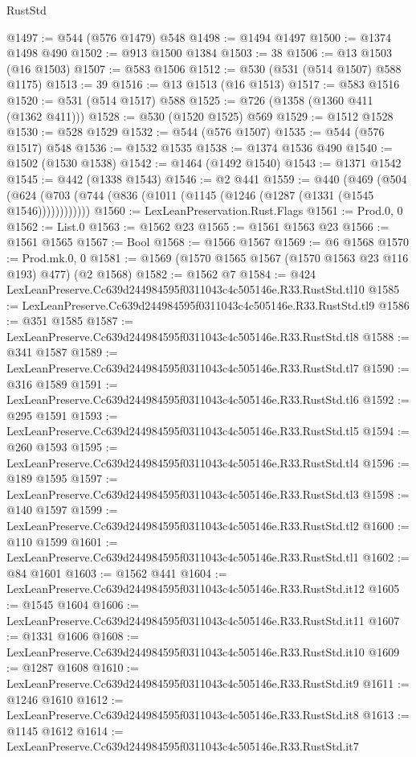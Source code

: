 \begin{lexlean}{RustStd}
\begin{coremodule}
@1497 := @544 (@576 @1479) @548
@1498 := @1494 @1497
@1500 := @1374 @1498 @490
@1502 := @913 @1500 @1384
@1503 := 38
@1506 := @13 @1503 (@16 @1503)
@1507 := @583 @1506
@1512 := @530 (@531 (@514 @1507) @588 @1175)
@1513 := 39
@1516 := @13 @1513 (@16 @1513)
@1517 := @583 @1516
@1520 := @531 (@514 @1517) @588
@1525 := @726 (@1358 (@1360 @411 (@1362 @411)))
@1528 := @530 (@1520 @1525) @569
@1529 := @1512 @1528
@1530 := @528 @1529
@1532 := @544 (@576 @1507)
@1535 := @544 (@576 @1517) @548
@1536 := @1532 @1535
@1538 := @1374 @1536 @490
@1540 := @1502 (@1530 @1538)
@1542 := @1464 (@1492 @1540)
@1543 := @1371 @1542
@1545 := @442 (@1338 @1543)
@1546 := @2 @441
@1559 := @440
    (@469 (@504 (@624 (@703 (@744 (@836 (@1011 (@1145 (@1246 (@1287 (@1331 (@1545 @1546))))))))))))
@1560 := LexLeanPreservation.Rust.Flags
@1561 := Prod.{0, 0}
@1562 := List.{0}
@1563 := @1562 @23
@1565 := @1561 @1563 @23
@1566 := @1561 @1565
@1567 := Bool
@1568 := @1566 @1567
@1569 := @6 @1568
@1570 := Prod.mk.{0, 0}
@1581 := @1569 (@1570 @1565 @1567 (@1570 @1563 @23 @116 @193) @477) (@2 @1568)
@1582 := @1562 @7
@1584 := @424 LexLeanPreserve.Cc639d244984595f0311043c4c505146e.R33.RustStd.tl10
@1585 := LexLeanPreserve.Cc639d244984595f0311043c4c505146e.R33.RustStd.tl9
@1586 := @351 @1585
@1587 := LexLeanPreserve.Cc639d244984595f0311043c4c505146e.R33.RustStd.tl8
@1588 := @341 @1587
@1589 := LexLeanPreserve.Cc639d244984595f0311043c4c505146e.R33.RustStd.tl7
@1590 := @316 @1589
@1591 := LexLeanPreserve.Cc639d244984595f0311043c4c505146e.R33.RustStd.tl6
@1592 := @295 @1591
@1593 := LexLeanPreserve.Cc639d244984595f0311043c4c505146e.R33.RustStd.tl5
@1594 := @260 @1593
@1595 := LexLeanPreserve.Cc639d244984595f0311043c4c505146e.R33.RustStd.tl4
@1596 := @189 @1595
@1597 := LexLeanPreserve.Cc639d244984595f0311043c4c505146e.R33.RustStd.tl3
@1598 := @140 @1597
@1599 := LexLeanPreserve.Cc639d244984595f0311043c4c505146e.R33.RustStd.tl2
@1600 := @110 @1599
@1601 := LexLeanPreserve.Cc639d244984595f0311043c4c505146e.R33.RustStd.tl1
@1602 := @84 @1601
@1603 := @1562 @441
@1604 := LexLeanPreserve.Cc639d244984595f0311043c4c505146e.R33.RustStd.it12
@1605 := @1545 @1604
@1606 := LexLeanPreserve.Cc639d244984595f0311043c4c505146e.R33.RustStd.it11
@1607 := @1331 @1606
@1608 := LexLeanPreserve.Cc639d244984595f0311043c4c505146e.R33.RustStd.it10
@1609 := @1287 @1608
@1610 := LexLeanPreserve.Cc639d244984595f0311043c4c505146e.R33.RustStd.it9
@1611 := @1246 @1610
@1612 := LexLeanPreserve.Cc639d244984595f0311043c4c505146e.R33.RustStd.it8
@1613 := @1145 @1612
@1614 := LexLeanPreserve.Cc639d244984595f0311043c4c505146e.R33.RustStd.it7

\end{coremodule}
\end{lexlean}
